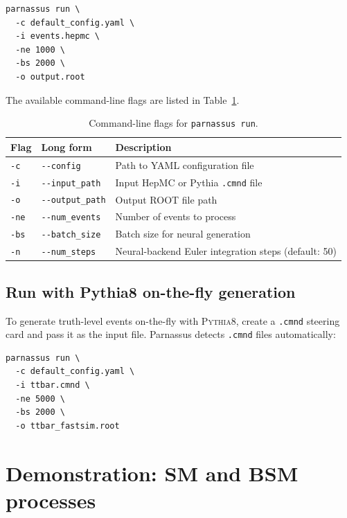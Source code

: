 \documentclass[11pt,a4paper]{article}          %
\begin{document}
\begin{lstlisting}[style=bash,caption={Basic command-line invocation.}]
parnassus run \
  -c default_config.yaml \
  -i events.hepmc \
  -ne 1000 \
  -bs 2000 \
  -o output.root
\end{lstlisting}

\noindent
The available command-line flags are listed in Table~\ref{tab:cli}.

\begin{table}[htbp]
\centering
\caption{Command-line flags for \texttt{parnassus run}.}
\label{tab:cli}
\begin{tabular}{@{}lll@{}}
\toprule
\textbf{Flag} & \textbf{Long form} & \textbf{Description} \\
\midrule
\texttt{-c} & \texttt{-{}-config}      & Path to YAML configuration file \\
\texttt{-i} & \texttt{-{}-input\_path}  & Input HepMC or Pythia \texttt{.cmnd} file \\
\texttt{-o} & \texttt{-{}-output\_path} & Output ROOT file path \\
\texttt{-ne} & \texttt{-{}-num\_events} & Number of events to process \\
\texttt{-bs} & \texttt{-{}-batch\_size} & Batch size for neural generation \\
\texttt{-n} & \texttt{-{}-num\_steps}   & Neural-backend Euler integration steps (default: 50) \\
\bottomrule
\end{tabular}
\end{table}

\subsection{Run with Pythia8 on-the-fly generation}

To generate truth-level events on-the-fly with \textsc{Pythia8}, create a
\texttt{.cmnd} steering card and pass it as the input file. Parnassus detects
\texttt{.cmnd} files automatically:

\begin{lstlisting}[style=bash]
parnassus run \
  -c default_config.yaml \
  -i ttbar.cmnd \
  -ne 5000 \
  -bs 2000 \
  -o ttbar_fastsim.root
\end{lstlisting}

\section{Demonstration: SM and BSM processes}
\label{sec:demo}
\end{document}
